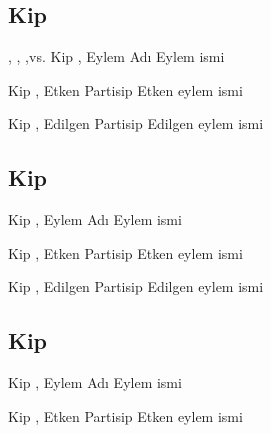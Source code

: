 \subsection*{Kip }


\begin{kip}{, , ,vs.}
  {Kip , Eylem Adı}
  Eylem ismi
\end{kip}

\begin{kip}{}{Kip , Etken Partisip}
  Etken eylem ismi
\end{kip}

\begin{kip}{}{Kip , Edilgen Partisip}
  Edilgen eylem ismi
\end{kip}



\subsection*{Kip }

\begin{kip}{}{Kip , Eylem Adı}
  Eylem ismi
\end{kip}

\begin{kip}{}{Kip , Etken Partisip}
  Etken eylem ismi
\end{kip}

\begin{kip}{}{Kip , Edilgen Partisip}
  Edilgen eylem ismi
\end{kip}

\subsection*{Kip }

\begin{kip}{}{Kip , Eylem Adı}
  Eylem ismi
\end{kip}

\begin{kip}{}{Kip , Etken Partisip}
  Etken eylem ismi
\end{kip}

